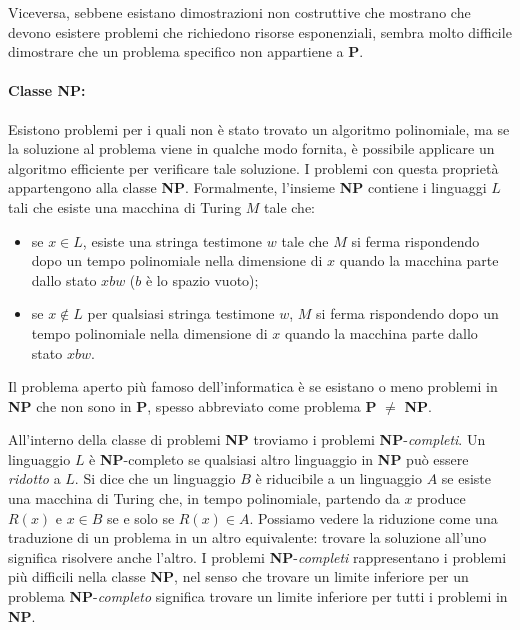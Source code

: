 Viceversa, sebbene esistano dimostrazioni non costruttive che mostrano che devono esistere problemi che richiedono risorse esponenziali, sembra molto difficile dimostrare che un problema specifico non appartiene a \textbf{P}.

\paragraph{Classe NP:} Esistono problemi per i quali non è stato trovato un algoritmo polinomiale, ma se la soluzione al problema viene in qualche modo fornita, è possibile applicare un algoritmo efficiente per verificare tale soluzione. I problemi con questa proprietà appartengono alla classe \textbf{NP}. Formalmente, l'insieme \textbf{NP} contiene i linguaggi $L$ tali che esiste una macchina di Turing $M$ tale che:
\begin{itemize}
	\item se $x \in L$, esiste una stringa testimone $w$ tale che $M$ si ferma rispondendo  dopo un tempo polinomiale nella dimensione di $x$ quando la macchina parte dallo stato $x b w$ ($b$ è lo spazio vuoto);
	\item se $x \notin L$ per qualsiasi stringa testimone $w$, $M$ si ferma rispondendo  dopo un tempo polinomiale nella dimensione di $x$ quando la macchina parte dallo stato $x b w$.
\end{itemize}
Il problema aperto più famoso dell'informatica è se esistano o meno problemi in \textbf{NP} che non sono in \textbf{P}, spesso abbreviato come problema \textbf{P} $\neq$ \textbf{NP}.

All'interno della classe di problemi \textbf{NP} troviamo i problemi \textbf{NP}-\emph{completi}. Un linguaggio $L$ è \textbf{NP}-completo se qualsiasi altro linguaggio in \textbf{NP} può essere \emph{ridotto} a $L$. Si dice che un linguaggio $B$ è riducibile a un linguaggio $A$ se esiste una macchina di Turing che, in tempo polinomiale, partendo da $x$ produce $R(x)$ e $x\in B$ se e solo se $R(x) \in A$. Possiamo vedere la riduzione come una traduzione di un problema in un altro equivalente: trovare la soluzione all'uno significa risolvere anche l'altro. I problemi \textbf{NP}-\emph{completi} rappresentano i problemi più difficili nella classe \textbf{NP}, nel senso che trovare un limite inferiore per un problema \textbf{NP}-\emph{completo} significa trovare un limite inferiore per tutti i problemi in \textbf{NP}.

